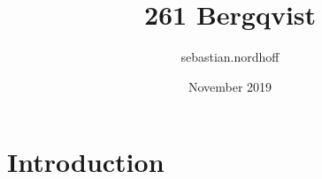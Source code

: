 \documentclass{article}
\title{261 Bergqvist}
\author{sebastian.nordhoff }
\date{November 2019}
\begin{document}
\maketitle

\section{Introduction}
\end{document}
